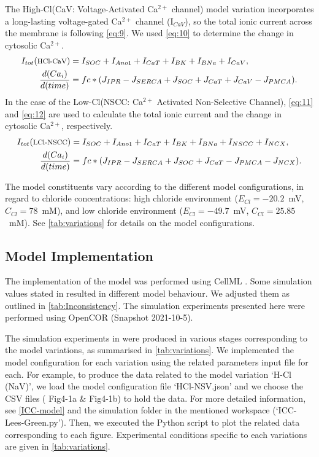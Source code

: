 \documentclass[fleqn,10pt]{physiome}
\begin{document}
The High-Cl(CaV: Voltage-Activated Ca$^{2+}$ channel) model variation incorporates a long-lasting voltage-gated Ca$^{2+}$ channel (I$_{CaV}$), so the total ionic current across the membrane is following \autoref{eq:9}. We used \autoref{eq:10} to determine the change in cytosolic Ca$^{2+}$.
\begin{align}
I_{tot}(\text{\footnotesize{HCl-CaV}}) &= I_{SOC}+I_{Ano1}+I_{CaT}+I_{BK}+I_{BNa}+I_{CaV}, \label{eq:9} \\
\frac {d(Ca_{i})}{d(time)}&= fc*(J_{IPR}-J_{SERCA}+J_{SOC}+J_{CaT}+J_{CaV}-J_{PMCA}).\label{eq:10}    
\end{align}
In the case of the Low-Cl(NSCC: Ca$^{2+}$ Activated Non-Selective Channel), \autoref{eq:11} and \autoref{eq:12} are used to calculate the total ionic current and the change in cytosolic Ca$^{2+}$, respectively.
\begin{align}
I_{tot}(\text{\footnotesize{LCl-NSCC}}) &= I_{SOC}+I_{Ano1}+I_{CaT}+I_{BK}+I_{BNa}+I_{NSCC}+I_{NCX},\label{eq:11} \\
\frac {d(Ca_{i})}{d(time)} &= fc*(J_{IPR}-J_{SERCA}+J_{SOC}+J_{CaT}-J_{PMCA}-J_{NCX}). \label{eq:12}    
\end{align}

The model constituents vary according to the different model configurations, in regard to chloride concentrations: high chloride environment ($E_{Cl} = - 20.2$~mV, $C_{Cl} = 78$~mM), and low chloride environment ($E_{Cl} = - 49.7$~mV, $C_{Cl} = 25.85$~mM). See \autoref{tab:variations} for details on the model configurations.


\subsection{Model Implementation}
The implementation of the model was performed using CellML \citep{doi:10.1177/0037549703040939}. Some simulation values stated in \citet{lees2014computational} resulted in different model behaviour. We adjusted them as outlined in \autoref{tab:Inconsistency}. The simulation experiments presented here were performed using OpenCOR (Snapshot 2021-10-5).

The simulation experiments in \citet[Figures 4 \& 5 ]{lees2014computational} were produced in various stages corresponding to the model variations, as summarised in \autoref{tab:variations}. We implemented the model configuration for each variation using the related parameters input file for each. For example, to produce the data related to the model variation `H-Cl (NaV)', we load the model configuration file `HCl-NSV.json' and we choose the CSV files ( Fig4-1a \& Fig4-1b) to hold the data. For more detailed information, see \autoref{ICC-model} and the simulation folder in the mentioned workspace (`ICC-Lees-Green.py'). Then, we executed the Python script to plot the related data corresponding to each figure.
Experimental conditions specific to each variations are given in \autoref{tab:variations}. 
\end{document}
